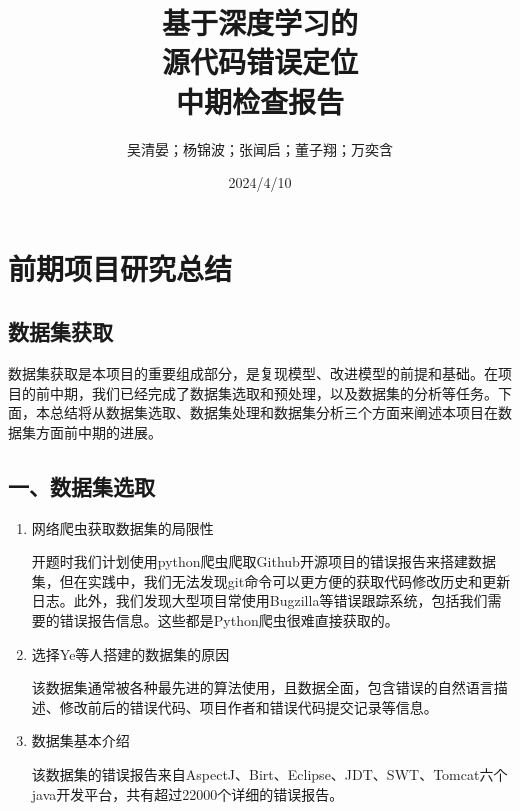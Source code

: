 \documentclass[12pt]{article}
\title{\vspace{3em}\kaishu 基于深度学习的\\
源代码错误定位\\
\vspace{1em}
\songti 中期检查报告\\
\vspace{18em}
}
\author{吴清晏；杨锦波；张闻启；董子翔；万奕含}
\date{2024/4/10}
\begin{document}
\maketitle
\thispagestyle{empty}
\clearpage
\tableofcontents
\thispagestyle{empty}
\clearpage
\setcounter{section}{1}
\thispagestyle{empty}

\setcounter{page}{2}

\setcounter{page}{6}
\section{前期项目研究总结}
\subsection{数据集获取}

数据集获取是本项目的重要组成部分，是复现模型、改进模型的前提和基础。在项目的前中期，我们已经完成了数据集选取和预处理，以及数据集的分析等任务。下面，本总结将从数据集选取、数据集处理和数据集分析三个方面来阐述本项目在数据集方面前中期的进展。

\subsection*{一、数据集选取}
\begin{enumerate}
      \item
            网络爬虫获取数据集的局限性

            开题时我们计划使用python爬虫爬取Github开源项目的错误报告来搭建数据集，但在实践中，我们无法发现git命令可以更方便的获取代码修改历史和更新日志。此外，我们发现大型项目常使用Bugzilla等错误跟踪系统，包括我们需要的错误报告信息。这些都是Python爬虫很难直接获取的。
      \item
            选择Ye等人搭建的数据集的原因

            该数据集通常被各种最先进的算法使用，且数据全面，包含错误的自然语言描述、修改前后的错误代码、项目作者和错误代码提交记录等信息。
      \item
            数据集基本介绍

            该数据集的错误报告来自AspectJ、Birt、Eclipse、JDT、SWT、Tomcat六个java开发平台，共有超过22000个详细的错误报告。
\end{enumerate}
\end{document}
